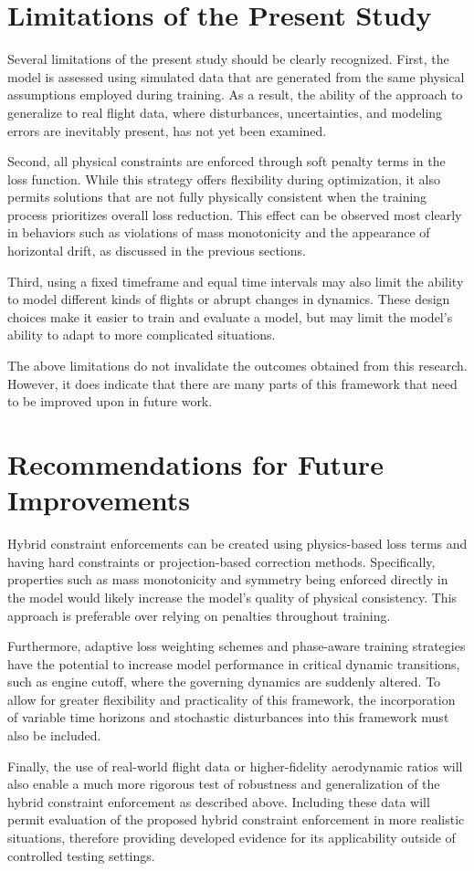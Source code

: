 \section{Limitations of the Present Study}

Several limitations of the present study should be clearly recognized. First, the model is assessed 
using simulated data that are generated from the same physical assumptions employed during training. 
As a result, the ability of the approach to generalize to real flight data, where disturbances, 
uncertainties, and modeling errors are inevitably present, has not yet been examined.

Second, all physical constraints are enforced through soft penalty terms in the loss function. While 
this strategy offers flexibility during optimization, it also permits solutions that are not fully 
physically consistent when the training process prioritizes overall loss reduction. This effect can 
be observed most clearly in behaviors such as violations of mass monotonicity and the appearance of 
horizontal drift, as discussed in the previous sections.

Third, using a fixed timeframe and equal time intervals may also limit the ability to model different 
kinds of flights or abrupt changes in dynamics. These design choices make it easier to train and evaluate 
a model, but may limit the model's ability to adapt to more complicated situations.

The above limitations do not invalidate the outcomes obtained from this research. However, it does indicate 
that there are many parts of this framework that need to be improved upon in future work.

\section{Recommendations for Future Improvements}
Hybrid constraint enforcements can be created using physics-based loss terms and having hard constraints or 
projection-based correction methods. Specifically, properties such as mass monotonicity and symmetry being 
enforced directly in the model would likely increase the model's quality of physical consistency. This approach 
is preferable over relying on penalties throughout training.

Furthermore, adaptive loss weighting schemes and phase-aware training strategies have the potential to increase model 
performance in critical dynamic transitions, such as engine cutoff, where the governing dynamics are suddenly altered. 
To allow for greater flexibility and practicality of this framework, the incorporation of variable time horizons and 
stochastic disturbances into this framework must also be included.

Finally, the use of real-world flight data or higher-fidelity aerodynamic ratios will also enable a much more rigorous test of 
robustness and generalization of the hybrid constraint enforcement as described above. Including these data will permit 
evaluation of the proposed hybrid constraint enforcement in more realistic situations, therefore providing developed 
evidence for its applicability outside of controlled testing settings.